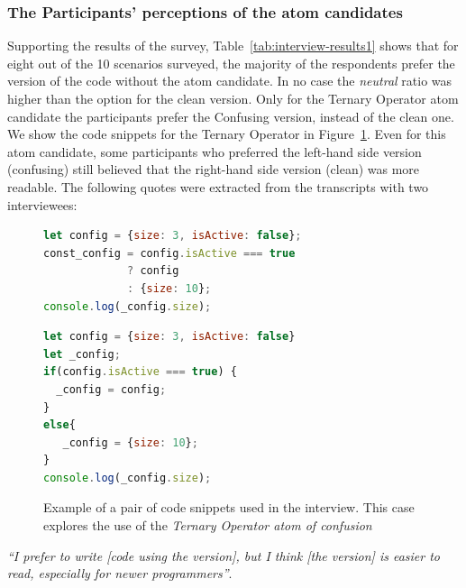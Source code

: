 \subsubsection*{The Participants' perceptions of the atom candidates}
Supporting the results of the survey, Table~\ref{tab:interview-results1}
 shows that for eight out of the
10 scenarios surveyed, the majority of the respondents prefer the version of the
code without the atom candidate.
In no case the \emph{neutral}
ratio was higher than the option for the clean version.
Only for the Ternary Operator atom candidate the participants prefer the Confusing version, instead of the clean one. We show the code snippets for the Ternary Operator in Figure~\ref{code:ternary}. Even for this atom candidate, some participants who preferred the left-hand side version (confusing) still believed that the right-hand side version (clean) was more readable. The following quotes were extracted from the transcripts with
two interviewees:

\begin{figure}

\noindent\begin{minipage}{.45\textwidth}
\begin{lstlisting}[language=JavaScript, caption=\emph{Left-hand side} (using the \emph{Ternary Operator} atom).]
let config = {size: 3, isActive: false};
const_config = config.isActive === true 
             ? config 
             : {size: 10};
console.log(_config.size);
\end{lstlisting}
\end{minipage}\hfill
\begin{minipage}{.45\textwidth}
\begin{lstlisting}[language=JavaScript, caption=\emph{Right-hand side} (without the atom).]
let config = {size: 3, isActive: false}
let _config;
if(config.isActive === true) {
  _config = config;
}
else{
   _config = {size: 10};
}
console.log(_config.size);
\end{lstlisting}
\end{minipage}
\caption{Example of a pair of code snippets used in the interview. This case explores the use of the \emph{Ternary Operator atom of confusion}}
\label{code:ternary}
\vspace{-0.2cm}
\end{figure}

\begin{mq}
\emph{``I prefer to write [code using the \lhs version], but I think [the \rhs version] is easier to read, especially for newer programmers''}.
\end{mq}

